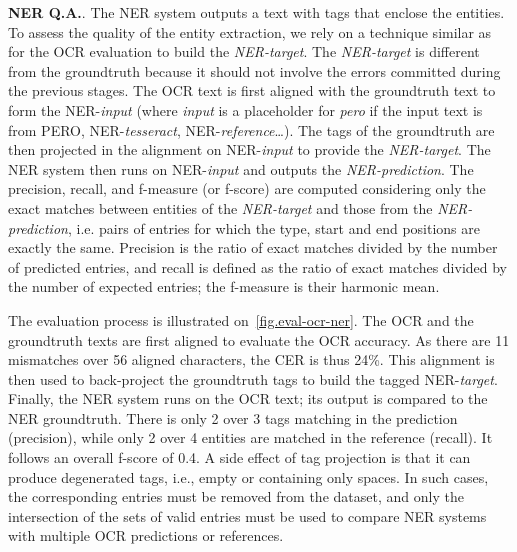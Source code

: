 

\textbf{NER Q.A.}. The NER system outputs a text with tags that enclose the entities. To assess the quality of the
entity extraction, we rely on a technique similar as for the OCR evaluation to build the \emph{NER-target}. The
\emph{NER-target} is different from the groundtruth because it should not involve the errors committed during the
previous stages. The OCR text is first aligned with the groundtruth text to form the NER-\emph{input} (where
\emph{input} is a placeholder for \emph{pero} if the input text is from PERO, NER-\emph{tesseract},
NER-\emph{reference}\ldots). The tags of the groundtruth are then projected in the alignment on NER-\emph{input} to
provide the \emph{NER-target}. The NER system then runs on NER-\emph{input} and outputs the \emph{NER-prediction}. The
precision, recall, and f-measure (or f-score) are computed considering only the exact matches between entities of the
\emph{NER-target} and those from the \emph{NER-prediction}, i.e. pairs of entries for which the type, start and end positions are exactly the same.
Precision is the ratio of exact matches divided by the number of predicted entries,
and recall is defined as the ratio of exact matches divided by the number of expected entries;
the f-measure is their harmonic mean.

The evaluation process is illustrated on~\cref{fig.eval-ocr-ner}. The OCR and the groundtruth texts are first aligned to
evaluate the OCR accuracy. As there are 11 mismatches over 56 aligned characters, the CER is thus 24\%. This alignment
is then used to back-project the groundtruth tags to build the tagged NER-\emph{target}. Finally, the NER system runs on the
OCR text; its output is compared to the NER groundtruth. There is only 2 over 3 tags matching in the prediction (precision),
while only 2 over 4 entities are matched in the reference (recall). It follows an overall f-score of 0.4.
%
A side effect of tag projection is that it can produce degenerated tags, i.e., empty or containing only spaces.
In such cases, the corresponding entries must be removed from the dataset,
and only the intersection of the sets of valid entries must be used to compare NER systems with multiple OCR predictions or references.
